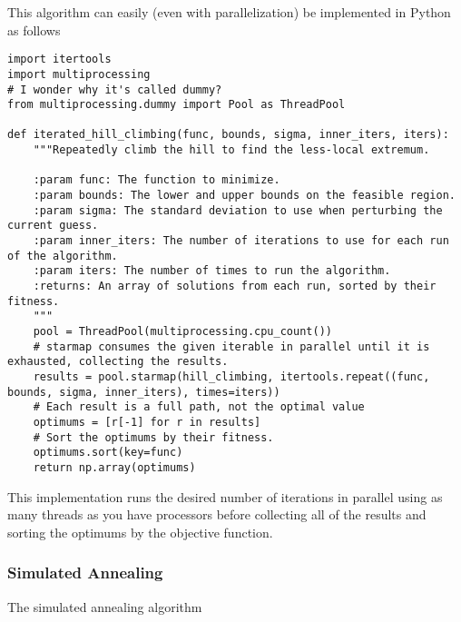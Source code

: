 \documentclass{article}
\begin{document}
This algorithm can easily (even with parallelization) be implemented in Python as follows
\begin{verbatim}
import itertools
import multiprocessing
# I wonder why it's called dummy?
from multiprocessing.dummy import Pool as ThreadPool

def iterated_hill_climbing(func, bounds, sigma, inner_iters, iters):
    """Repeatedly climb the hill to find the less-local extremum.

    :param func: The function to minimize.
    :param bounds: The lower and upper bounds on the feasible region.
    :param sigma: The standard deviation to use when perturbing the current guess.
    :param inner_iters: The number of iterations to use for each run of the algorithm.
    :param iters: The number of times to run the algorithm.
    :returns: An array of solutions from each run, sorted by their fitness.
    """
    pool = ThreadPool(multiprocessing.cpu_count())
    # starmap consumes the given iterable in parallel until it is exhausted, collecting the results.
    results = pool.starmap(hill_climbing, itertools.repeat((func, bounds, sigma, inner_iters), times=iters))
    # Each result is a full path, not the optimal value
    optimums = [r[-1] for r in results]
    # Sort the optimums by their fitness.
    optimums.sort(key=func)
    return np.array(optimums)
\end{verbatim}
This implementation runs the desired number of iterations in parallel using as many threads as you
have processors before collecting all of the results and sorting the optimums by the objective
function.

\subsubsection{Simulated Annealing}

\begin{algorithm}
    \begin{algorithmic}
                \EndIf{}
            \EndWhile{}
            \State{}
        \EndFunction{}
    \end{algorithmic}
    \caption{The simulated annealing algorithm}\label{alg:simulated-annealing}
\end{algorithm}
\end{document}
